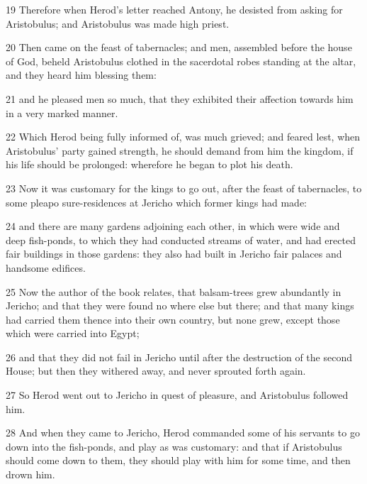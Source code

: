 \par 19 Therefore when Herod’s letter reached Antony, he desisted from asking for Aristobulus; and Aristobulus was made high priest. 

\par 20 Then came on the feast of tabernacles; and men, assembled before the house of God, beheld Aristobulus clothed in the sacerdotal robes standing at the altar, and they heard him blessing them: 

\par 21 and he pleased men so much, that they exhibited their affection towards him in a very marked manner. 

\par 22 Which Herod being fully informed of, was much grieved; and feared lest, when Aristobulus’ party gained strength, he should demand from him the kingdom, if his life should be prolonged: wherefore he began to plot his death. 

\par 23 Now it was customary for the kings to go out, after the feast of tabernacles, to some pleapo sure-residences at Jericho which former kings had made: 

\par 24 and there are many gardens adjoining each other, in which were wide and deep fish-ponds, to which they had conducted streams of water, and had erected fair buildings in those gardens: they also had built in Jericho fair palaces and handsome edifices.

\par 25 Now the author of the book relates, that balsam-trees grew abundantly in Jericho; and that they were found no where else but there; and that many kings had carried them thence into their own country, but none grew, except those which were carried into Egypt; 

\par 26 and that they did not fail in Jericho until after the destruction of the second House; but then they withered away, and never sprouted forth again. 

\par 27 So Herod went out to Jericho in quest of pleasure, and Aristobulus followed him. 

\par 28 And when they came to Jericho, Herod commanded some of his servants to go down into the fish-ponds, and play as was customary: and that if Aristobulus should come down to them, they should play with him for some time, and then drown him. 

